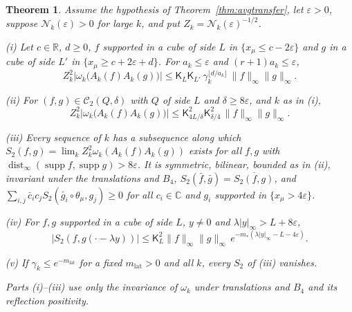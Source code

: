 \documentclass[aps,prd,twocolumn,superscriptaddress,nofootinbib,longbibliography,floatfix,amsmath,amssymb,10pt]{revtex4-2}
\newtheorem{theorem}{Theorem}
\theoremstyle{definition}
\theoremstyle{remark}
\newcommand{\R}{\mathbb{R}}
\newcommand{\C}{\mathbb{C}}
\newcommand{\dist}{\operatorname{dist}}
\begin{document}
\begin{theorem}\label{thm:limitEtwo}
Assume the hypothesis of Theorem~\textup{\ref{thm:avgtransfer}}, let
$\varepsilon>0$, suppose $\mathcal N_k(\varepsilon)>0$ for large $k$, and put
$Z_k=\mathcal N_k(\varepsilon)^{-1/2}$.

\textup{(i)} Let $c\in\R$, $d\ge0$, $f$ supported in a cube of side $L$ in
$\{x_\mu\le c-2\varepsilon\}$ and $g$ in a cube of side $L'$ in
$\{x_\mu\ge c+2\varepsilon+d\}$. For $a_k\le\varepsilon$ and $(r+1)a_k\le
\varepsilon$,
\[
Z_k^2\bigl|\omega_k\bigl(A_k(f)A_k(g)\bigr)\bigr|\le\mathsf K_L\mathsf
K_{L'}\,\gamma_k^{\lfloor d/a_k\rfloor}\,\|f\|_\infty\|g\|_\infty .
\]

\textup{(ii)} For $(f,g)\in\mathcal C_2(Q,\delta)$ with $Q$ of side $L$ and
$\delta\ge8\varepsilon$, and $k$ as in \textup{(i)},
\[
Z_k^2\bigl|\omega_k\bigl(A_k(f)A_k(g)\bigr)\bigr|\le\mathsf K_{4L/\delta}^2
\mathsf K_{\delta/4}^2\,\|f\|_\infty\|g\|_\infty .
\]

\textup{(iii)} Every sequence of $k$ has a subsequence along which
$S_2(f,g)=\lim_kZ_k^2\omega_k(A_k(f)A_k(g))$ exists for all $f,g$ with
$\dist_\infty(\operatorname{supp}f,\operatorname{supp}g)>8\varepsilon$. It
is symmetric, bilinear, bounded as in \textup{(ii)}, invariant under the
translations and $B_4$, $S_2(\bar f,\bar g)=\overline{S_2(f,g)}$, and
$\sum_{i,j}\bar c_ic_jS_2(\bar g_i\circ\theta_\mu,g_j)\ge0$ for all $c_i\in
\C$ and $g_i$ supported in $\{x_\mu>4\varepsilon\}$.

\textup{(iv)} For $f,g$ supported in a cube of side $L$, $y\ne0$ and
$\lambda|y|_\infty>L+8\varepsilon$,
\[
\bigl|S_2(f,g(\cdot-\lambda y))\bigr|\le\mathsf K_L^2\|f\|_\infty
\|g\|_\infty\,e^{-m_*(\lambda|y|_\infty-L-4\varepsilon)} .
\]

\textup{(v)} If $\gamma_k\le e^{-m_{\mathrm{lat}}}$ for a fixed $m_{\mathrm{lat}}>0$ and all $k$, every
$S_2$ of \textup{(iii)} vanishes.

Parts \textup{(i)--(iii)} use only the invariance of $\omega_k$ under
translations and $B_4$ and its reflection positivity.
\end{theorem}
\end{document}
